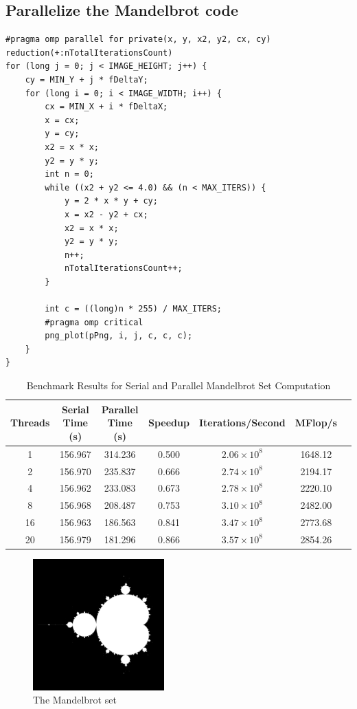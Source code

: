 \documentclass[unicode,11pt,a4paper,oneside,numbers=endperiod,openany]{scrartcl}
\begin{document}
\subsection{Parallelize the Mandelbrot code}
\begin{lstlisting}[language=MyC++, style=mystyle, caption={Parallel Mandelbrot Calculation with OpenMP}]
#pragma omp parallel for private(x, y, x2, y2, cx, cy) reduction(+:nTotalIterationsCount)
for (long j = 0; j < IMAGE_HEIGHT; j++) {
    cy = MIN_Y + j * fDeltaY;
    for (long i = 0; i < IMAGE_WIDTH; i++) {
        cx = MIN_X + i * fDeltaX;
        x = cx;
        y = cy;
        x2 = x * x;
        y2 = y * y;
        int n = 0;
        while ((x2 + y2 <= 4.0) && (n < MAX_ITERS)) {
            y = 2 * x * y + cy;
            x = x2 - y2 + cx;
            x2 = x * x;
            y2 = y * y;
            n++;
            nTotalIterationsCount++;
        }

        int c = ((long)n * 255) / MAX_ITERS;
        #pragma omp critical
        png_plot(pPng, i, j, c, c, c);
    }
}
\end{lstlisting}
\begin{table}[ht]
    \centering
    \caption{Benchmark Results for Serial and Parallel Mandelbrot Set Computation}
    \begin{tabular}{@{}ccccccc@{}}
        \toprule
        \textbf{Threads} & \textbf{Serial Time (s)} & \textbf{Parallel Time (s)} & \textbf{Speedup} & \textbf{Iterations/Second} & \textbf{MFlop/s} \\
        \midrule
        1  & 156.967 & 314.236 & 0.500 & $2.06 \times 10^8$ & 1648.12 \\
        2  & 156.970 & 235.837 & 0.666 & $2.74 \times 10^8$ & 2194.17 \\
        4  & 156.962 & 233.083 & 0.673 & $2.78 \times 10^8$ & 2220.10 \\
        8  & 156.968 & 208.487 & 0.753 & $3.10 \times 10^8$ & 2482.00 \\
        16 & 156.963 & 186.563 & 0.841 & $3.47 \times 10^8$ & 2773.68 \\
        20 & 156.979 & 181.296 & 0.866 & $3.57 \times 10^8$ & 2854.26 \\
        \bottomrule
    \end{tabular}
    \label{tab:mandelbrot_results}
\end{table}
\begin{figure}[h]
    \centering
    \includegraphics[width=0.45\textwidth]{pictures/mandel.png}
    \caption{The Mandelbrot set}
\end{figure}
\end{document}
